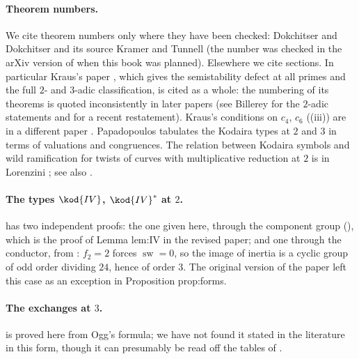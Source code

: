 \paragraph{Theorem numbers.} We cite theorem numbers only where they have been checked: Dokchitser and
Dokchitser \cite[Theorem 3.1]{DokDok15} and its source Kramer and Tunnell \cite[Proposition 8.20]{KramerTunnell82} (the number was checked in the arXiv
version of \cite{DokDok15} when this book was planned). Elsewhere we cite sections. In particular Kraus's paper \cite{Kraus90}, which gives the semistability defect at
all primes and the full $2$- and $3$-adic classification, is cited as a whole: the numbering of its theorems is quoted inconsistently in
later papers (see Billerey \cite{Billerey09} for the $2$-adic statements and \cite{PinedaMartin26} for a recent restatement). Kraus's
conditions on $c_4$, $c_6$ ((iii)) are in a different paper \cite{Kraus89}. Papadopoulos
\cite{Papadopoulos93} tabulates the Kodaira types at $2$ and $3$ in terms of valuations and congruences. The relation between Kodaira
symbols and wild ramification for twists of curves with multiplicative reduction at $2$ is in Lorenzini \cite{Lorenzini10}; see also
\cite{Praveen26}.

\paragraph{The types $\kod{IV}$, $\kod{IV}^*$ at $2$.}  has two independent proofs: the one given here,
through the component group (), which is the proof of Lemma lem:IV in the revised paper; and
one through the conductor, from : $f_2=2$ forces $\operatorname{sw}=0$, so the image of inertia is a
cyclic group of odd order dividing $24$, hence of order $3$. The original version of the paper left this case as an exception in Proposition
prop:forms.

\paragraph{The exchanges at $3$.}  is proved here from Ogg's formula; we have not found it stated in the
literature in this form, though it can presumably be read off the tables of \cite{Papadopoulos93}.


